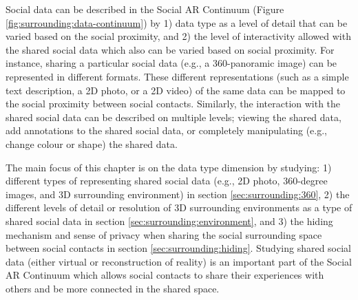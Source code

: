 


Social data can be described in the Social AR Continuum (Figure \ref{fig:surrounding:data-continuum}) by 1) data type as a level of detail that can be varied based on the social proximity, and 2) the level of interactivity allowed with the shared social data which also can be varied based on social proximity. For instance, sharing a particular social data (e.g., a 360-panoramic image) can be represented in different formats. These different representations (such as a simple text description, a 2D photo, or a 2D video) of the same data can be mapped to the social proximity between social contacts. Similarly, the interaction with the shared social data can be described on multiple levels; viewing the shared data, add annotations to the shared social data, or completely manipulating (e.g., change colour or shape) the shared data. 

The main focus of this chapter is on the data type dimension by studying: 1) different types of representing shared social data (e.g., 2D photo, 360-degree images, and 3D surrounding environment) in section \ref{sec:surrounding:360}, 2) the different levels of detail or resolution of 3D surrounding environments as a type of shared social data in section \ref{sec:surrounding:environment}, and 3) the hiding mechanism and sense of privacy when sharing the social surrounding space between social contacts in section \ref{sec:surrounding:hiding}. Studying shared social data (either virtual or reconstruction of reality) is an important part of the Social AR Continuum which allows social contacts to share their experiences with others and be more connected in the shared space. 


